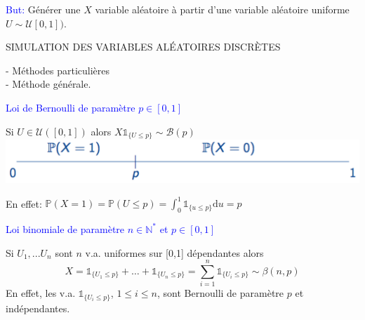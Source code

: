 {\textcolor{blue}{But:} Générer une $X$ variable aléatoire à partir d'une variable aléatoire uniforme $U \sim \mathcal{U} [0,1])$. \\

\vspace{1cm}

\begin{center}
\begin{Large}
SIMULATION DES VARIABLES ALÉATOIRES DISCRÈTES \\
\end{Large}
\end{center}

- Méthodes particulières \\
- Méthode générale. \\

\begin{Large}
\hspace{2mm} \colorbox{gray!20}{\textcolor{blue}{Loi de Bernoulli de paramètre $p \in [0,1]$}}
\end{Large}

\begin{center}
Si $U \in \mathcal{U} ([0,1])$ alors $X \mathds{1}_{\{U \leq p\}} \sim \mathcal{B} (p)$ \\
\includegraphics[scale=0.6]{content/Figure3.PNG}
\end{center}
En effet: $\mathbb{P} (X = 1) = \mathbb{P} (U \leq p) = \int_{0}^{1} \mathds{1}_{\{u \leq p\}} \mathrm{d}u = p$ \\

\begin{Large}
\hspace{2mm} \colorbox{gray!20}{\textcolor{blue}{Loi binomiale de paramètre $n \in \mathbb{N}^{*}$ et  $p \in [0,1]$}}
\end{Large}

\hspace{4mm} Si $U_{1}, ... U_{n}$ sont $n$ v.a. uniformes sur [0,1] dépendantes alors
\[ X = \mathds{1}_{\{U_{1} \leq p \}} + \dots + \mathds{1}_{\{U_{n} \leq p \}} = \sum \limits_{i=1}^{n} \mathds{1}_{\{U_{i} \leq p\}} \sim \beta (n,p) \]
En effet, les v.a. $\mathds{1}_{\{U_{i} \leq p\}}$, $1 \leq i \leq n$, sont Bernoulli de paramètre $p$ et indépendantes. \\

}
